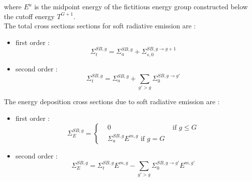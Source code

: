 where $E^u$ is the midpoint energy of the fictitious energy group constructed
below the cutoff energy $T^{G+1}$.\\
The total cross sections sections for soft radiative emission are :
\begin{itemize}
\item first order :
\begin{equation}
\Sigma_{t}^{SB,g} = \Sigma_{a}^{SB,g} + \Sigma_{s,0}^{SB,g\rightarrow g+1}
\end{equation}
\item second order :
\begin{equation}
\Sigma_t^{SB,g} = \Sigma_{a}^{SB,g} + \sum_{g' > g}\Sigma_{0}^{SB,g\rightarrow g'}
\end{equation}
\end{itemize}

The energy deposition cross sections due to soft radiative emission are :
\begin{itemize}
\item first order :
\begin{equation}
\Sigma_E^{SB,g} = 
\left\{
\begin{aligned}
& 0 & \textrm{ if } g\leq G\\
& \Sigma_a^{SB,g} E^{m,g} \textrm{ if } g=G
\end{aligned}
\right.
\end{equation}
\item second order :
\begin{equation}
\Sigma_E^{SB,g} = \Sigma_{t}^{SB,g} E^{m,g} - \sum_{g'>g}
\Sigma_{0}^{SB,g\rightarrow g'} E^{m,g'}
\end{equation}
\end{itemize}

